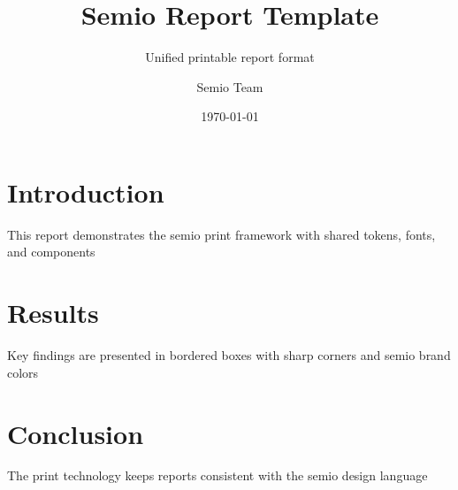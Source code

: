 \documentclass[type=report,theme=light,language=de]{semio}
\title{Semio Report Template}
\author{Semio Team}
\date{\today}
\subtitle{Unified printable report format}
\begin{document}
\maketitle
\tableofcontents

\chapter{Introduction}
This report demonstrates the semio print framework with shared tokens, fonts, and components

\chapter{Results}
\begin{Semiobox}
  Key findings are presented in bordered boxes with sharp corners and semio brand colors
\end{Semiobox}

\chapter{Conclusion}
The print technology keeps reports consistent with the semio design language
\end{document}
